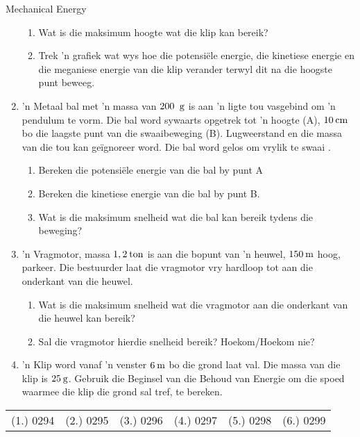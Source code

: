 \begin{eocexercises}{Mechanical Energy}
\begin{enumerate}[noitemsep, label=\textbf{\arabic*}. ]
\label{m38786*id71971}\begin{enumerate}[noitemsep, label=\textbf{\alph*}. ] 
            \label{m38786*uid133}\item Wat is die maksimum hoogte wat die klip kan bereik?
\label{m38786*uid134}\item Trek  'n grafiek wat wys hoe die potensiële energie, die kinetiese energie en die meganiese energie van die klip verander terwyl dit na die hoogste punt beweeg.
\end{enumerate}
                  \label{m38786*uid135}\item  'n Metaal bal met  'n massa van  $200\phantom{\rule{2pt}{0ex}}\text{ g}$ is aan  'n ligte tou vasgebind om  'n pendulum te vorm. Die bal word sywaarts opgetrek tot  'n hoogte (A), $10\phantom{\rule{2pt}{0ex}}\text{cm}$ bo die laagste punt van die swaaibeweging (B). Lugweerstand en die massa van die tou kan geïgnoreer word. Die bal word gelos om vrylik te swaai .
\label{m38786*id72026}\begin{enumerate}[noitemsep, label=\textbf{\alph*}. ] 
            \label{m38786*uid136}\item Bereken die potensiële energie van die bal by punt A
\label{m38786*uid137}\item Bereken die kinetiese energie van die bal by punt B.
\label{m38786*uid138}\item Wat is die maksimum snelheid wat die bal kan bereik tydens die beweging?
\end{enumerate}
                \label{m38786*uid139}\item  'n Vragmotor, massa $1,2\phantom{\rule{2pt}{0ex}}\text{ton}$ is aan die bopunt van  'n heuwel,  $150\phantom{\rule{2pt}{0ex}}\text{m}$ hoog, parkeer. Die bestuurder laat die vragmotor vry hardloop tot aan die onderkant van die heuwel.
\label{m38786*id72082}\begin{enumerate}[noitemsep, label=\textbf{\alph*}. ] 
            \label{m38786*uid140}\item Wat is die maksimum snelheid wat die vragmotor aan die onderkant van die heuwel kan bereik?
\label{m38786*uid141}\item Sal die vragmotor hierdie snelheid bereik? Hoekom/Hoekom nie?
\end{enumerate}
                \label{m38786*uid142}\item  'n Klip word vanaf  'n venster $6\phantom{\rule{2pt}{0ex}}\text{m}$ bo die grond laat val. Die massa van die klip is $25\phantom{\rule{2pt}{0ex}}\text{g}$.
Gebruik die Beginsel van die Behoud van Energie om die spoed waarmee die klip die grond sal tref, te bereken.
           \end{enumerate}
  \label{m38786**end}
  \label{1fc5ba69690764517c30802fdf7b1905**end}
\practiceinfo
 \par \begin{tabular}[h]{cccccc}
 (1.) 0294  &  (2.) 0295  &  (3.) 0296  &  (4.) 0297  &  (5.) 0298  &  (6.) 0299  & \end{tabular}
\end{eocexercises}
